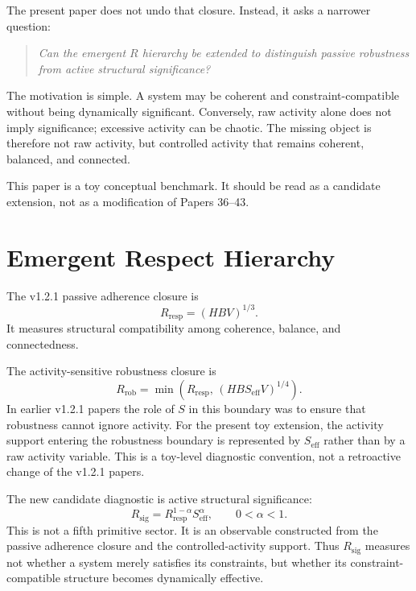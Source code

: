 \documentclass[11pt,a4paper]{article}
\newcommand{\Rresp}{R_{\mathrm{resp}}}
\newcommand{\Rrob}{R_{\mathrm{rob}}}
\newcommand{\Rsig}{R_{\mathrm{sig}}}
\newcommand{\Seff}{S_{\mathrm{eff}}}
\begin{document}
The present paper does not undo that closure.
Instead, it asks a narrower question:
\begin{quote}
\emph{Can the emergent $R$ hierarchy be extended to distinguish passive
robustness from active structural significance?}
\end{quote}

The motivation is simple.
A system may be coherent and constraint-compatible without being dynamically
significant.
Conversely, raw activity alone does not imply significance; excessive activity
can be chaotic.
The missing object is therefore not raw activity, but controlled activity that
remains coherent, balanced, and connected.

This paper is a toy conceptual benchmark.
It should be read as a candidate extension, not as a modification of Papers
36--43.

\section{Emergent Respect Hierarchy}

The v1.2.1 passive adherence closure is
\begin{equation}
\boxed{
\Rresp=(HBV)^{1/3}.
}
\label{eq:rresp}
\end{equation}
It measures structural compatibility among coherence, balance, and
connectedness.

The activity-sensitive robustness closure is
\begin{equation}
\boxed{
\Rrob=
\min\!\left(
\Rresp,\,
(HB\Seff V)^{1/4}
\right).
}
\label{eq:rrob}
\end{equation}
In earlier v1.2.1 papers the role of $S$ in this boundary was to ensure that
robustness cannot ignore activity.
For the present toy extension, the activity support entering the robustness
boundary is represented by $\Seff$ rather than by a raw activity variable.
This is a toy-level diagnostic convention, not a retroactive change of the
v1.2.1 papers.

The new candidate diagnostic is active structural significance:
\begin{equation}
\boxed{
\Rsig
=
\Rresp^{1-\alpha}\Seff^\alpha,
\qquad
0<\alpha<1.
}
\label{eq:rsig}
\end{equation}
This is not a fifth primitive sector.
It is an observable constructed from the passive adherence closure and the
controlled-activity support.
Thus $\Rsig$ measures not whether a system merely satisfies its constraints,
but whether its constraint-compatible structure becomes dynamically
effective.
\end{document}
